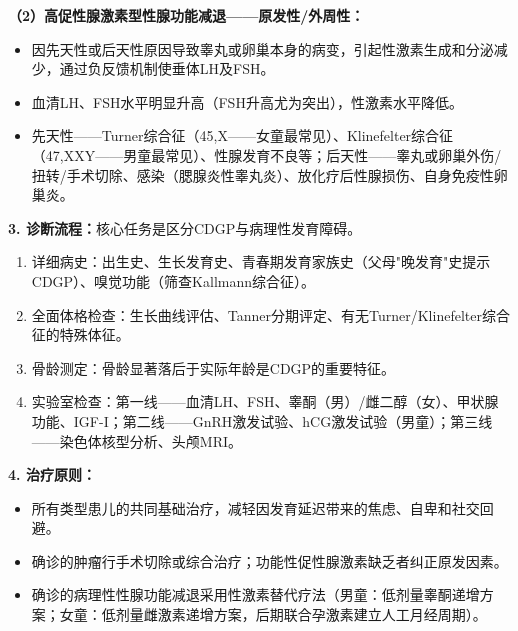 \begin{keybox}
\textbf{（2）高促性腺激素型性腺功能减退——原发性/外周性：}
\begin{itemize}[leftmargin=*]
    \item {}因先天性或后天性原因导致睾丸或卵巢本身的病变，引起性激素生成和分泌减少，通过负反馈机制使垂体LH及FSH。
    \item {}血清LH、FSH水平明显升高（FSH升高尤为突出），性激素水平降低。
    \item {}先天性——Turner综合征（45,X——女童最常见）、Klinefelter综合征（47,XXY——男童最常见）、性腺发育不良等；后天性——睾丸或卵巢外伤/扭转/手术切除、感染（腮腺炎性睾丸炎）、放化疗后性腺损伤、自身免疫性卵巢炎。
\end{itemize}

\vspace{6pt}

\textbf{3. 诊断流程：}核心任务是区分CDGP与病理性发育障碍。
\begin{enumerate}[leftmargin=*]
    \item 详细病史：出生史、生长发育史、青春期发育家族史（父母"晚发育"史提示CDGP）、嗅觉功能（筛查Kallmann综合征）。
    \item 全面体格检查：生长曲线评估、Tanner分期评定、有无Turner/Klinefelter综合征的特殊体征。
    \item 骨龄测定：骨龄显著落后于实际年龄是CDGP的重要特征。
    \item 实验室检查：第一线——血清LH、FSH、睾酮（男）/雌二醇（女）、甲状腺功能、IGF-I；第二线——GnRH激发试验、hCG激发试验（男童）；第三线——染色体核型分析、头颅MRI。
\end{enumerate}

\textbf{4. 治疗原则：}
\begin{itemize}[leftmargin=*]
    \item {}所有类型患儿的共同基础治疗，减轻因发育延迟带来的焦虑、自卑和社交回避。
    \item {}确诊的肿瘤行手术切除或综合治疗；功能性促性腺激素缺乏者纠正原发因素。
    \item {}确诊的病理性性腺功能减退采用性激素替代疗法（男童：低剂量睾酮递增方案；女童：低剂量雌激素递增方案，后期联合孕激素建立人工月经周期）。
\end{itemize}

\vspace{3pt}
\begin{center}
\end{center}
\vspace{3pt}
\end{keybox}

\newpage
